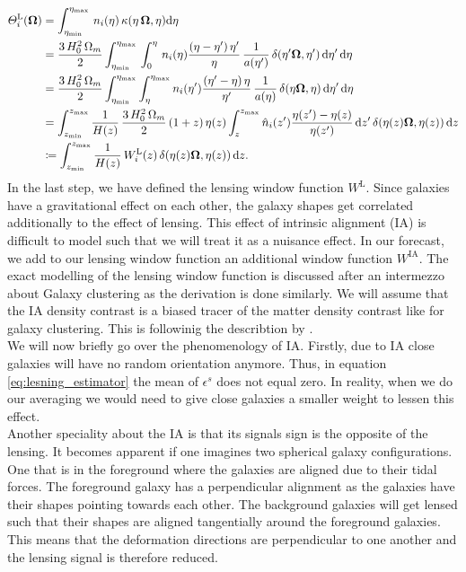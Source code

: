 \documentclass[../main.tex]{subfiles}
\begin{document}
\begin{align}
\varTheta_i^\mathrm{L}(\boldsymbol{\Omega})&= \int_{\eta_\mathrm{min}}^{\eta_\mathrm{max}} \, n_i(\eta)\,\kappa(\eta\,\boldsymbol{\Omega},\eta) \mathrm{d}\eta \\
&=  \frac{3\,H_0^2\,\Omega_m}{2} \int_{\eta_\mathrm{min}}^{\eta_\mathrm{max}}  \,\int_0^\eta \, n_i(\eta) \frac{(\eta-\eta')\,\eta'}{\eta}\,\frac{1}{a(\eta')}\,\delta(\eta'\boldsymbol{\Omega},\eta') \,\mathrm{d}\eta' \, \mathrm{d}\eta \nonumber \\
&= \frac{3\,H_0^2\,\Omega_m}{2} \int_{\eta_\mathrm{min}}^{\eta_\mathrm{max}} \int_{\eta}^{\eta_\mathrm{max}} n_i(\eta') \frac{(\eta'-\eta)\,\eta}{\eta'}\,\frac{1}{a(\eta)}\,\delta(\eta\boldsymbol{\Omega},\eta) \,\mathrm{d}\eta' \, \mathrm{d}\eta \nonumber\\
&= \int_{z_\mathrm{min}}^{z_\mathrm{max}} \frac{1}{H(z)}\,\frac{3\,H_0^2\,\Omega_m}{2}\, (1+z)\,\eta(z) \int_z^{z_\mathrm{max}} \hat{n}_i(z') \frac{\eta(z')-\eta(z)}{\eta(z')} \,\mathrm{d} z' \,\delta(\eta(z)\boldsymbol{\Omega},\eta(z)) \,\mathrm{d} z \nonumber \\
\label{eq:lensing_observable}&\coloneqq \int_{z_\mathrm{min}}^{z_\mathrm{max}} \frac{1}{H(z)}\, W_i^\mathrm{L}(z) \,\delta(\eta(z)\boldsymbol{\Omega},\eta(z)) \,\mathrm{d} z. 
\end{align} 
In the last step, we have defined the lensing window function $W^\mathrm{L}$. Since galaxies have a gravitational effect on each other, the galaxy shapes get correlated additionally to the effect of lensing. This effect of intrinsic alignment (IA) is difficult to model such that we will treat it as a nuisance effect. In our forecast, we add to our lensing window function an additional window function $W^\mathrm{IA}$. The exact modelling of the lensing window function is discussed after an intermezzo about Galaxy clustering as the derivation is done similarly. We will assume that the IA density contrast is a biased tracer of the matter density contrast like for galaxy clustering. This is followinig the describtion by \cite{PhysRevD.82.049901}.\\
We will now briefly go over the phenomenology of IA. Firstly, due to IA close galaxies will have no random orientation anymore. Thus, in equation \ref{eq:lesning_estimator} the mean of $\epsilon^s$ does not equal zero. In reality, when we do our averaging we would need to give close galaxies a smaller weight to lessen this effect.\\
Another speciality about the IA is that its signals sign is the opposite of the lensing. It becomes apparent if one  imagines two spherical galaxy configurations. One that is in the foreground where the galaxies are aligned due to their tidal forces. The foreground galaxy has a perpendicular alignment as the galaxies have their shapes pointing towards each other. The background galaxies will get lensed such that their shapes are aligned tangentially around the foreground galaxies. This means that the deformation directions are perpendicular to one another and the lensing signal is therefore reduced.\\
\end{document}

